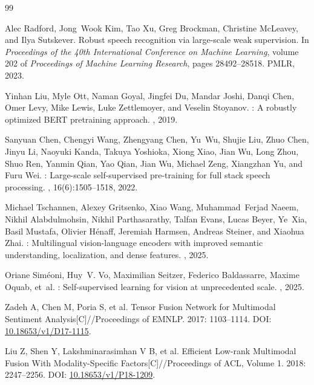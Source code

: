 {\small
\begin{thebibliography}{99}

Alec Radford, Jong~Wook Kim, Tao Xu, Greg Brockman, Christine McLeavey, and
  Ilya Sutskever.
\newblock Robust speech recognition via large-scale weak supervision.
\newblock In {\em Proceedings of the 40th International Conference on Machine
  Learning}, volume 202 of {\em Proceedings of Machine Learning Research},
  pages 28492--28518. PMLR, 2023.

Yinhan Liu, Myle Ott, Naman Goyal, Jingfei Du, Mandar Joshi, Danqi Chen, Omer
  Levy, Mike Lewis, Luke Zettlemoyer, and Veselin Stoyanov.
: A robustly optimized {BERT} pretraining approach.
, 2019.

Sanyuan Chen, Chengyi Wang, Zhengyang Chen, Yu~Wu, Shujie Liu, Zhuo Chen, Jinyu
  Li, Naoyuki Kanda, Takuya Yoshioka, Xiong Xiao, Jian Wu, Long Zhou, Shuo Ren,
  Yanmin Qian, Yao Qian, Jian Wu, Michael Zeng, Xiangzhan Yu, and Furu Wei.
: Large-scale self-supervised pre-training for full stack
  speech processing.
,
  16(6):1505--1518, 2022.

Michael Tschannen, Alexey Gritsenko, Xiao Wang, Muhammad~Ferjad Naeem, Nikhil
  Alabdulmohsin, Nikhil Parthasarathy, Talfan Evans, Lucas Beyer, Ye~Xia, Basil
  Mustafa, Olivier H{\'e}naff, Jeremiah Harmsen, Andreas Steiner, and Xiaohua
  Zhai.
: Multilingual vision-language encoders with improved
  semantic understanding, localization, and dense features.
, 2025.

Oriane Sim{\'e}oni, Huy~V. Vo, Maximilian Seitzer, Federico Baldassarre, Maxime
  Oquab, et~al.
: Self-supervised learning for vision at unprecedented scale.
, 2025.

 Zadeh A, Chen M, Poria S, et al. Tensor Fusion Network for Multimodal Sentiment Analysis[C]//Proceedings of EMNLP. 2017: 1103--1114. DOI: \url{10.18653/v1/D17-1115}.

 Liu Z, Shen Y, Lakshminarasimhan V B, et al. Efficient Low-rank Multimodal Fusion With Modality-Specific Factors[C]//Proceedings of ACL, Volume 1. 2018: 2247--2256. DOI: \url{10.18653/v1/P18-1209}.


\end{thebibliography}}
